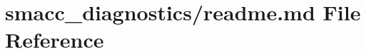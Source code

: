 \hypertarget{smacc__diagnostics_2readme_8md}{}\section{smacc\+\_\+diagnostics/readme.md File Reference}
\label{smacc__diagnostics_2readme_8md}
